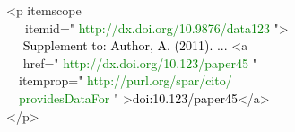 \raggedright\small\ttfamily\frenchspacing
<p \textcolor{dccblue}{itemscope\\~~~itemid="}%
\textcolor{Green}{http://dx.doi.org/10.9876/data123}%
\textcolor{dccblue}{"}>\\~~%
\textcolor{black}{Supplement to: Author, A. (2011). ... }<a\\~~%
\textcolor{dccblue}{href="}%
\textcolor{Green}{http://dx.doi.org/10.123/paper45}%
\textcolor{dccblue}{"\\~~itemprop="}%
\textcolor{Green}{http://purl.org/spar/cito/\\~~providesDataFor}%
\textcolor{dccblue}{"}%
>\textcolor{black}{doi:10.123/paper45}</a>\\</p>